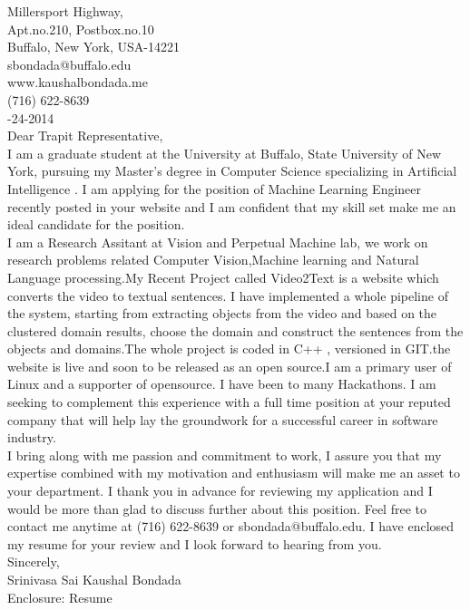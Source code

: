 \documentclass[10pt,letterpaper,oneside]{article}
\begin{document}
 Millersport Highway,\\
Apt.no.210, Postbox.no.10\\
Buffalo, New York, USA-14221\\
sbondada@buffalo.edu\\
www.kaushalbondada.me\\
(716) 622-8639\\

-24-2014\\
 
\noindent Dear Trapit Representative,\\
 
I am a graduate student at the University at Buffalo, State University of New York, pursuing my Master's degree in Computer Science specializing in Artificial Intelligence . I am applying
for the position of Machine Learning Engineer recently posted in your website and I am confident that my skill set make me an ideal candidate for the position.\\

I am a Research Assitant at Vision and Perpetual Machine lab, we work on research problems related Computer Vision,Machine learning and Natural Language processing.My Recent Project called
Video2Text is a website which converts the video to textual sentences. I have implemented a whole pipeline of the system, starting from extracting objects from the video and based on the
clustered domain results, choose the domain and construct the sentences from the objects and domains.The whole project is coded in C++ , versioned in GIT.the website is live and soon to be released
as an open source.I am a primary user of Linux and a supporter of opensource. I have been to many Hackathons. I am seeking to complement this experience with a full time position at your reputed company that will help lay the groundwork for a successful career in software industry.\\

I bring along with me passion and commitment to work, I assure you that my expertise combined with my motivation
and enthusiasm will make me an asset to your department. I thank you in advance for reviewing my application and I would be more than glad to
discuss further about this position. Feel free to contact me anytime at (716) 622-8639 or sbondada@buffalo.edu. I have enclosed my resume for your review and I look forward to hearing from you.\\
 
\noindent Sincerely,\\
Srinivasa Sai Kaushal Bondada\\
Enclosure: Resume\\
\end{document}
